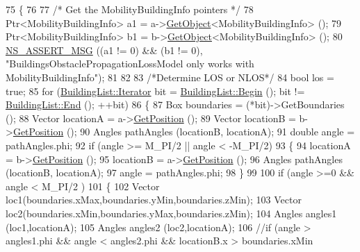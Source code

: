 \begin{DoxyCode}
75 \{
76 
77         \textcolor{comment}{/* Get the MobilityBuildingInfo pointers */}
78         Ptr<MobilityBuildingInfo> a1 = a->\hyperlink{classns3_1_1Object_a13e18c00017096c8381eb651d5bd0783}{GetObject}<MobilityBuildingInfo> ();
79         Ptr<MobilityBuildingInfo> b1 = b->\hyperlink{classns3_1_1Object_a13e18c00017096c8381eb651d5bd0783}{GetObject}<MobilityBuildingInfo> ();
80         \hyperlink{assert_8h_aff5ece9066c74e681e74999856f08539}{NS\_ASSERT\_MSG} ((a1 != 0) && (b1 != 0), \textcolor{stringliteral}{"BuildingsObstaclePropagationLossModel only
       works with MobilityBuildingInfo"});
81 
82 
83         \textcolor{comment}{/*Determine LOS or NLOS*/}
84         \textcolor{keywordtype}{bool} los = \textcolor{keyword}{true};
85         \textcolor{keywordflow}{for} (\hyperlink{classns3_1_1BuildingList_a84957ecea4b4343f676da0e96f2c8130}{BuildingList::Iterator} bit = 
      \hyperlink{classns3_1_1BuildingList_adbb122872e11541e930f0a3afa70a479}{BuildingList::Begin} (); bit != \hyperlink{classns3_1_1BuildingList_abc6b941dbb194efb9f00352cc6b3db65}{BuildingList::End} (); ++bit)
86         \{
87                 Box boundaries = (*bit)->GetBoundaries ();
88                 Vector locationA = a->\hyperlink{classns3_1_1MobilityModel_aba838f06ec5bbb2d193d94b8c0e4abb4}{GetPosition} ();
89                 Vector locationB = b->\hyperlink{classns3_1_1MobilityModel_aba838f06ec5bbb2d193d94b8c0e4abb4}{GetPosition} ();
90                 Angles pathAngles (locationB, locationA);
91                 \textcolor{keywordtype}{double} angle = pathAngles.phi;
92                 \textcolor{keywordflow}{if} (angle >= M\_PI/2 || angle < -M\_PI/2)
93                 \{
94                         locationA = b->\hyperlink{classns3_1_1MobilityModel_aba838f06ec5bbb2d193d94b8c0e4abb4}{GetPosition} ();
95                         locationB = a->\hyperlink{classns3_1_1MobilityModel_aba838f06ec5bbb2d193d94b8c0e4abb4}{GetPosition} ();
96                         Angles pathAngles (locationB, locationA);
97                         angle = pathAngles.phi;
98                 \}
99 
100                 \textcolor{keywordflow}{if} (angle >=0 && angle < M\_PI/2 )
101                 \{
102                         Vector loc1(boundaries.xMax,boundaries.yMin,boundaries.zMin);
103                         Vector loc2(boundaries.xMin,boundaries.yMax,boundaries.zMin);
104                         Angles angles1 (loc1,locationA);
105                         Angles angles2 (loc2,locationA);
106                         \textcolor{comment}{//if (angle > angles1.phi && angle < angles2.phi && locationB.x > boundaries.xMin
}
\end{DoxyCode}
